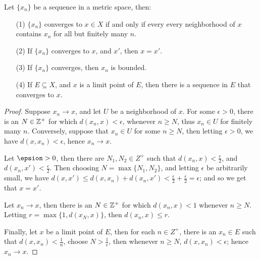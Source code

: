 \begin{theorem}\label{theorem_3.1.1}
  Let $\{x_n\}$ be a sequence in a metric space, then:
  \begin{enumerate}
    \item[(1)] $\{x_n\}$ converges to  $x \in X$ if and only if every every
      neighborhood of $x$ contains  $x_n$ for all but finitely many  $n$.

    \item[(2)] If  $\{x_n\}$ converges to  $x$, and  $x'$, then $x=x'$.

    \item[(3)] If $\{x_n\}$ converges, then  $x_n$ is bounded.

    \item[(4)] If $E \subseteq X$, and  $x$ is a limit point of  $E$, then there
      is a sequence  in  $E$ that converges to  $x$.
  \end{enumerate}
\end{theorem}
\begin{proof}
  Suppose $x_n \rightarrow x$, and let  $U$ be a neighborhood of  $x$. For some
  $\epsilon>0$, there is an $N \in \mathbb{Z}^+$ for which $d(x_n,x)<\epsilon$, whenever
  $n \geq N$, thus $x_n \in U$ for finitely many  $n$. Conversely, suppose that
  $x_n \in U$ for some  $n \geq N$, then  letting  $\epsilon>0$, we have
  $d(x,x_n)<\epsilon$, hence $x_n \rightarrow x$.

  Let  $\epsion>0$, then there are $N_1,N_2 \in Z^+$ such that
  $d(x_n,x)<\frac{\epsilon}{2}$, and $d(x_n,x')<\frac{\epsilon}{2}$. Then
  choosing $N=\max\{N_1,N_2\}$, and letting $\epsilon$ be arbitrarily small, we
  have  $d(x,x') \leq d(x,x_n)+d(x_n,x')<\frac{\epsilon}{2}+\frac{\epsilon}{2}=
  \epsilon$; and so we get that $x=x'$.

  Let  $x_n \rightarrow x$, then there is an  $N \in \mathbb{Z}^+$ for which
  $d(x_n,x)<1$ whenever $n \geq N$. Letting  $r=\max\{1,d(x_N,x)\}$, then
  $d(x_n,x) \leq r$.

  Finally, let $x$ be a limit point of  $E$, then for each  $n \in Z^+$, there
  is an  $x_n \in E$ such that  $d(x,x_n)<\frac{1}{n}$, choose
  $N>\frac{1}{\epsilon}$, then whenever $n \geq N$, $d(x,x_n)<\epsilon$; hence
  $x_n \rightarrow x$.
\end{proof}

